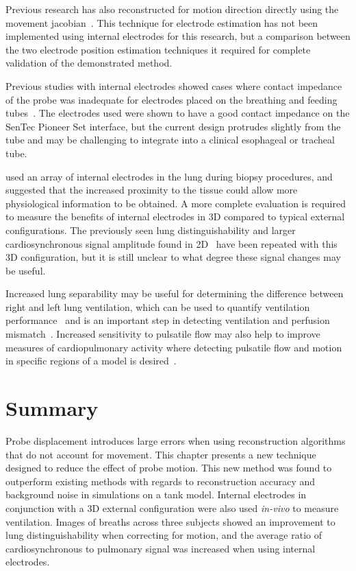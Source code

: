 Previous research has also 
reconstructed for motion direction directly using the movement
jacobian~\parencite{boyle_geophysical_2016,gomez-laberge_direct_2008,soleimani_imaging_2006}.
This technique for electrode estimation has not been implemented using internal electrodes 
for this research, but a comparison between the two electrode position estimation techniques 
it required for complete validation of the demonstrated method.

Previous studies with internal electrodes showed cases where contact impedance of the probe
was inadequate for electrodes
placed on the breathing and feeding tubes~\parencite{czaplik_application_2014}.
The electrodes used were shown to have a good contact impedance on the SenTec Pioneer
Set interface, but the current design protrudes slightly from the tube and may be challenging to 
integrate into a clinical esophageal or tracheal tube.

 used an array of internal electrodes in the lung 
during biopsy procedures, and suggested that the increased proximity to the 
tissue could allow more physiological information to be obtained. A more complete 
evaluation is required to measure the benefits of internal electrodes in 3D compared 
to typical external configurations. The previously seen lung distinguishability
and larger cardiosynchronous signal amplitude found in 2D~\parencite{czaplik_application_2014} 
have been repeated with this 3D configuration, but it is still unclear to what 
degree these signal changes may be useful. 

Increased lung separability may be useful for determining the difference between right 
and left lung ventilation, which can be used to quantify ventilation 
performance~\parencite{sage_assessing_2018}
and is an important step in detecting ventilation and perfusion
mismatch~\parencite{stowe_comparison_2019,kircher_regional_2021,leonhardt_electrical_2012}.
Increased sensitivity to pulsatile flow may also help to improve measures
of cardiopulmonary activity where detecting pulsatile flow 
and motion in specific regions of a model is 
desired~\parencite{braun_accuracy_2018,proenca_non-invasive_2020}.

\section{Summary}
Probe displacement introduces large errors when using 
reconstruction algorithms that do not account for movement. This chapter presents
a new technique designed to reduce the effect of probe motion.
This new method 
was found to outperform existing methods with regards to reconstruction 
accuracy and background noise in simulations on a tank model. 
Internal electrodes in conjunction with a 3D external configuration were also 
used \emph{in-vivo} to measure ventilation. 
Images of breaths across three subjects showed an improvement to lung distinguishability
when correcting for motion, and the average ratio of cardiosynchronous
to pulmonary signal was increased when using internal electrodes. 